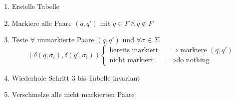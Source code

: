 \documentclass[a4paper,parskip=half,footsepline=on,headings=normal,titlepage=false]{scrartcl}
\begin{document}
\begin{enumerate}
    \item Erstelle Tabelle
    \item Markiere alle Paare $(q, q')$ mit $q\in F \wedge q\notin F$
    \item Teste $\forall$ unmarkierte Paare $(q, q')$ und $\forall \sigma \in \Sigma$
    \[
     (\delta(q,\sigma_i), \delta(q',\sigma_i))
      \begin{cases} 
       \text{bereits markiert } & \implies \text{markiere } (q, q') \\
       \text{nicht markiert } & \implies \text{do nothing}
      \end{cases}
    \]
    \item Wiederhole Schritt 3 bis Tabelle invariant
    \item Verschmelze alle nicht markierten Paare
\end{enumerate}
\end{document}
